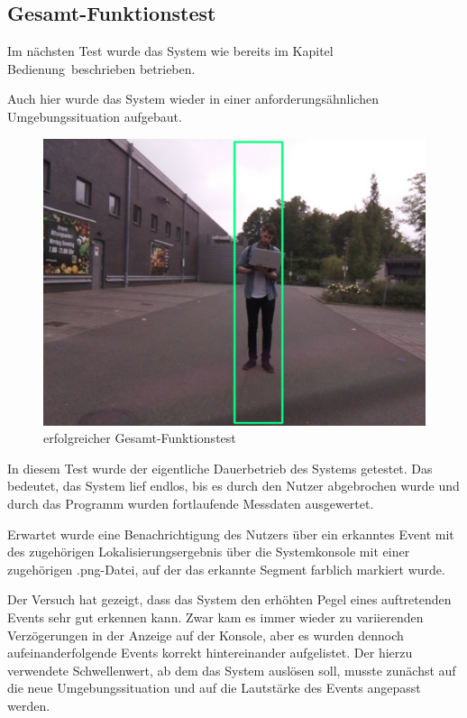 \subsection{Gesamt-Funktionstest}

Im nächsten Test wurde das System wie bereits im Kapitel \glqq Bedienung\grqq\ beschrieben betrieben. 

Auch hier wurde das System wieder in einer anforderungsähnlichen Umgebungssituation aufgebaut.

\begin{figure}[h]
	\begin{center}
		\includegraphics[scale=0.1]{Sections/Tests/Test_7}
	\end{center}
	\caption{erfolgreicher Gesamt-Funktionstest}
	\label{fig:Test_7}
\end{figure}

In diesem Test wurde der eigentliche Dauerbetrieb des Systems getestet. Das bedeutet, das System lief endlos, bis es durch den Nutzer abgebrochen wurde und durch das Programm wurden fortlaufende Messdaten ausgewertet. 

Erwartet wurde eine Benachrichtigung des Nutzers über ein erkanntes Event mit des zugehörigen Lokalisierungsergebnis über die Systemkonsole mit einer zugehörigen .png-Datei, auf der das erkannte Segment farblich markiert wurde.

Der Versuch hat gezeigt, dass das System den erhöhten Pegel eines auftretenden Events sehr gut erkennen kann. Zwar kam es immer wieder zu variierenden Verzögerungen in der Anzeige auf der Konsole, aber es wurden dennoch aufeinanderfolgende Events korrekt hintereinander aufgelistet. Der hierzu verwendete Schwellenwert, ab dem das System auslösen soll, musste zunächst auf die neue Umgebungssituation und auf die Lautstärke des Events angepasst werden. 

